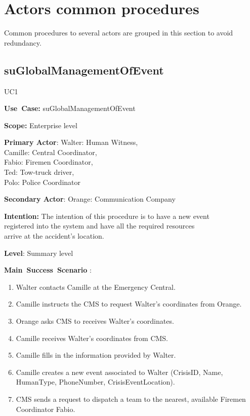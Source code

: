 \section{Actors common procedures}
Common procedures to several actors are grouped in this section to avoid
redundancy.

\subsection{suGlobalManagementOfEvent}
\begin{lyxlist}{UC1}
\small{
\item [\textbf{Use~Case:}] suGlobalManagementOfEvent
\item [\textbf{Scope:}] Enterprise level
\item [\textbf{Primary Actor}:] Walter: Human Witness,\\ 
						        Camille: Central Coordinator,\\
								Fabio: Firemen Coordinator,\\
								Ted: Tow-truck driver,\\ 
								Polo: Police Coordinator
\item [\textbf{Secondary Actor}:] Orange: Communication Company
\item [\textbf{Intention:}] The intention of this procedure is to have a new
event\\ registered into the system and have all the required resources\\ arrive
at the accident’s location.
\item [\textbf{Level}:] Summary level
\item [\textbf{Main~Success~Scenario}]:
\begin{enumerate}
  \item Walter contacts Camille at the Emergency Central.
  \item Camille instructs the CMS to request Walter’s coordinates from Orange.
  \item Orange asks CMS to receives Walter’s coordinates.
  \item Camille receives Walter’s coordinates from CMS.
  \item Camille fills in the information provided by Walter.
  \item Camille creates a new event associated to Walter (CrisisID, Name,
  HumanType, PhoneNumber, CrisisEventLocation).
  \item CMS sends a request to dispatch a team to the nearest, available Firemen
  Coordinator Fabio.

\end{enumerate}}
\end{lyxlist}
